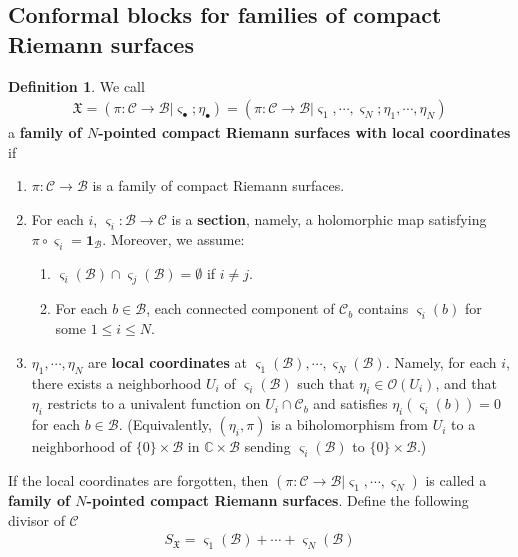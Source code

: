 \documentclass[11pt,b5paper,notitlepage]{article}
\theoremstyle{definition}
\newtheorem{df}{Definition}[section]
\theoremstyle{plain}
\newcommand{\fk}{\mathfrak}
\newcommand{\mc}{\mathcal}
\newcommand{\idt}{\mathbf{1}}
\newcommand{\sgm}{\varsigma}
\newcommand{\SX}{{S_{\fk X}}}
\newcommand{\blt}{\bullet}
\newcommand{\Cbb}{\mathbb C}
\newcommand{\<}{\left\langle}
\renewcommand{\>}{\right\rangle}
\newcommand{\MC}{\mathcal{C}}
\newcommand{\MB}{\mathcal{B}}
\newcommand{\fx}{\mathfrak{X}}
\numberwithin{equation}{section}
\begin{document}
\subsection{Conformal blocks for families of compact Riemann surfaces}



\begin{df}\label{lb1}
We call 
\begin{align}
\fx=(\pi:\mc C\rightarrow\mc B|\sgm_\blt;\eta_\blt)=(\pi:\MC\rightarrow \MB\big| \varsigma_1,\cdots,\varsigma_N;\eta_1,\cdots,\eta_N)   
\end{align}
a \textbf{family of $N$-pointed compact Riemann surfaces with local coordinates} if 
\begin{enumerate}[label=(\arabic*)]
    \item  $\pi:\MC\rightarrow \MB$ is a family of compact Riemann surfaces.
    \item  For each $i$, $\sgm_i:\mc B\rightarrow\mc C$ is a \textbf{section}, namely, a holomorphic map satisfying $\pi\circ\sgm_i=\idt_{\mc B}$. Moreover, we assume:
    \begin{enumerate}[label=(\alph*)]
        \item $\sgm_i(\mc B)\cap\sgm_j(\mc B)=\emptyset$ if $i\neq j$.
        \item For each $b\in\mc B$, each connected component of $\MC_b$ contains $\varsigma_i(b)$ for some $1\leq i\leq N$.
    \end{enumerate}
    \item  $\eta_1,\cdots,\eta_N$ are \textbf{local coordinates} at $\varsigma_1(\mc B),\cdots,\varsigma_N(\mc B)$. Namely, for each $i$, there exists a neighborhood $U_i$ of $\varsigma_i(\MB)$ such that $\eta_i\in\mc O(U_i)$, and that $\eta_i$ restricts to a univalent function on $U_i\cap \MC_b$  and satisfies $\eta_i(\varsigma_i(b))=0$ for each $b\in \MB$. (Equivalently, $(\eta_i,\pi)$ is a biholomorphism from $U_i$ to a neighborhood of $\{0\}\times\mc B$ in $\Cbb\times\mc B$ sending $\sgm_i(\mc B)$ to $\{0\}\times\mc B$.)
\end{enumerate}
If the local coordinates are forgotten, then $(\pi:\MC\rightarrow \MB\big| \varsigma_1,\cdots,\varsigma_N)$ is called a \textbf{family of $N$-pointed compact Riemann surfaces}. Define the following divisor of $\mc C$ \index{SX@$\SX=\sgm_1(\mc B)+\cdots+\sgm_N(\mc B)$}
   \begin{align}
\SX=\sgm_1(\mc B)+\cdots+\sgm_N(\mc B)
   \end{align}
\end{df}
\end{document}
